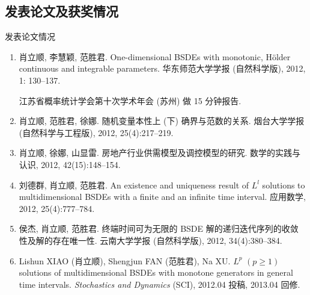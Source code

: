 \documentclass[xcolor=svgnames,serif,table,10pt]{beamer}
\begin{document}
\subsection{发表论文及获奖情况}

\begin{frame}{发表论文情况}
\scriptsize\sffamily
  \begin{enumerate}
    \item {\normalfont 肖立顺}, 李慧颖, 范胜君. One-dimensional BSDEs with monotonic,
          H\"older continuous and integrable parameters. 华东师范大学学报
          (自然科学版), 2012, 1: 130--137.\pause

          江苏省概率统计学会第十次学术年会 (苏州) 做 15 分钟报告. \pause

    \item {\normalfont 肖立顺}, 范胜君, 徐娜. 随机变量本性上 (下) 确界与范数的关系.
          烟台大学学报 (自然科学与工程版), 2012, 25(4):217--219.
    \item {\normalfont  肖立顺}, 徐娜, 山显雷. 房地产行业供需模型及调控模型的研究.
          数学的实践与认识, 2012, 42(15):148--154.
    \item 刘德群, {\normalfont 肖立顺}, 范胜君. An existence and uniqueness result of $L^l$
          solutions to multidimensional BSDEs with a finite and an infinite time interval.
          应用数学, 2012, 25(4):777--784.
    \item 侯杰, {\normalfont 肖立顺}, 范胜君. 终端时间可为无限的 BSDE 解的递归迭代序列的收敛
          性及解的存在唯一性. 云南大学学报 (自然科学版), 2012, 34(4):380--384.
    \item Lishun XIAO ({\normalfont 肖立顺}), Shengjun FAN (范胜君), Na XU. $L^p$
          $(p\geq 1)$ solutions
          of multidimensional BSDEs with monotone generators in general time intervals.
          {\itshape Stochastics and Dynamics} (SCI), 2012.04 投稿, 2013.04 回修.
  \end{enumerate}
\end{frame}
\end{document}
